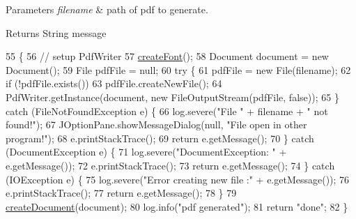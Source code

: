 \begin{DoxyParams}{Parameters}
{\em filename} & path of pdf to generate. \\
\hline
\end{DoxyParams}
\begin{DoxyReturn}{Returns}
String message 
\end{DoxyReturn}

\begin{DoxyCode}
55                                              \{
56         \textcolor{comment}{// setup PdfWriter}
57         \hyperlink{classit_1_1isislab_1_1masonassisteddocumentation_1_1mason_1_1control_1_1_pdf_rtf_generator_af1f9a21f995c47a9e1a5a6f276c97852}{createFont}();
58         Document document = \textcolor{keyword}{new} Document();
59         File pdfFile = null;
60         \textcolor{keywordflow}{try} \{
61             pdfFile = \textcolor{keyword}{new} File(filename);
62             \textcolor{keywordflow}{if} (!pdfFile.exists())
63                 pdfFile.createNewFile();
64             PdfWriter.getInstance(document, \textcolor{keyword}{new} FileOutputStream(pdfFile, \textcolor{keyword}{false}));
65         \} \textcolor{keywordflow}{catch} (FileNotFoundException e) \{
66             log.severe(\textcolor{stringliteral}{"File "} + filename + \textcolor{stringliteral}{" not found!"});
67             JOptionPane.showMessageDialog(null, \textcolor{stringliteral}{"File open in other program!"});
68             e.printStackTrace();
69             \textcolor{keywordflow}{return} e.getMessage();
70         \} \textcolor{keywordflow}{catch} (DocumentException e) \{
71             log.severe(\textcolor{stringliteral}{"DocumentException: "} + e.getMessage());
72             e.printStackTrace();
73             \textcolor{keywordflow}{return} e.getMessage();
74         \} \textcolor{keywordflow}{catch} (IOException e) \{
75             log.severe(\textcolor{stringliteral}{"Error creating new file :"} + e.getMessage());
76             e.printStackTrace();
77             \textcolor{keywordflow}{return} e.getMessage();
78         \}
79         \hyperlink{classit_1_1isislab_1_1masonassisteddocumentation_1_1mason_1_1control_1_1_pdf_rtf_generator_add23c0e308cdf54a3c1e3a8128ea29ed}{createDocument}(document);
80         log.info(\textcolor{stringliteral}{"pdf generated"});
81         \textcolor{keywordflow}{return} \textcolor{stringliteral}{"done"};
82     \}
\end{DoxyCode}


